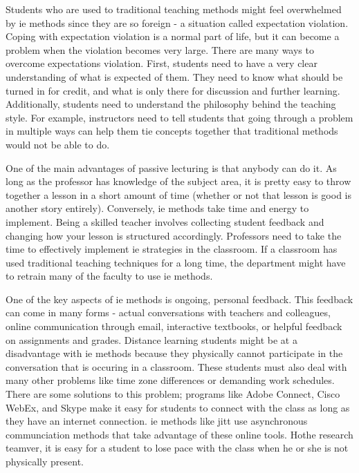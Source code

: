 Students who are used to traditional teaching methods might feel overwhelmed by \gls{ie} methods since they are so foreign - a situation called expectation violation. Coping with expectation violation is a normal part of life, but it can become a problem when the violation becomes very large. There are many ways to overcome expectations violation. First, students need to have a very clear understanding of what is expected of them. They need to know what should be turned in for credit, and what is only there for discussion and further learning. Additionally, students need to understand the philosophy behind the teaching style. For example, instructors need to tell students that going through a problem in multiple ways can help them tie concepts together that traditional methods would not be able to do.

One of the main advantages of passive lecturing is that anybody can do it. As long as the professor has knowledge of the subject area, it is pretty easy to throw together a lesson in a short amount of time (whether or not that lesson is good is another story entirely). Conversely, \gls{ie} methods take time and energy to implement. Being a skilled teacher involves collecting student feedback and changing how your lesson is structured accordingly. Professors need to take the time to effectively implement \gls{ie} strategies in the classroom. If a classroom has used traditional teaching techniques for a long time, the department might have to retrain many of the faculty to use \gls{ie} methods.

One of the key aspects of \gls{ie} methods is ongoing, personal feedback. This feedback can come in many forms - actual conversations with teachers and colleagues, online communication through email, interactive textbooks, or helpful feedback on assignments and grades. Distance learning students might be at a disadvantage with \gls{ie} methods because they physically cannot participate in the conversation that is occuring in a classroom. These students must also deal with many other problems like time zone differences or demanding work schedules. There are some solutions to this problem; programs like Adobe Connect, Cisco WebEx, and Skype make it easy for students to connect with the class as long as they have an internet connection. \gls{ie} methods like \gls{jitt} use asynchronous communciation methods that take advantage of these online tools. Hothe research teamver, it is easy for a student to lose pace with the class when he or she is not physically present.

